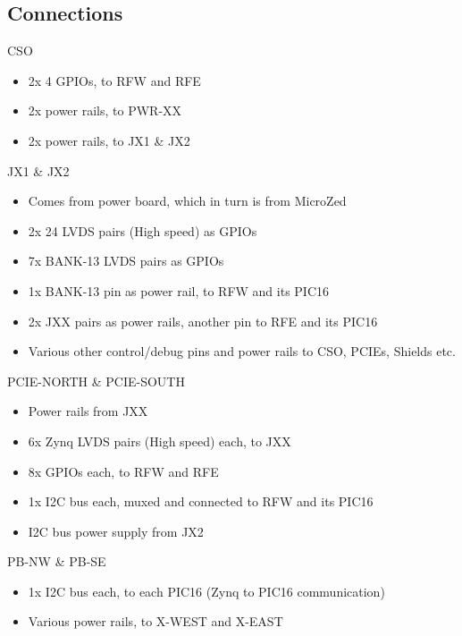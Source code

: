 \documentclass{beamer}
\begin{document}
\subsection{Connections}

\begin{frame}{CSO}
    \begin{itemize}
    \item 2x 4 GPIOs, to RFW and RFE 
    \item 2x power rails, to PWR-XX
    \item 2x power rails, to JX1 \& JX2
    \end{itemize}
\end{frame}

\begin{frame}{JX1 \& JX2}
    \begin{itemize}
    \item Comes from power board, which in turn is from MicroZed
    \item 2x 24 LVDS pairs (High speed) as GPIOs
    \item 7x BANK-13 LVDS pairs as GPIOs
    \item 1x BANK-13 pin as power rail, to RFW and its PIC16
    \item 2x JXX pairs as power rails, another pin to RFE and its PIC16
    \item Various other control/debug pins and power rails to CSO, PCIEs, Shields etc.
    \end{itemize}
\end{frame}

\begin{frame}{PCIE-NORTH \& PCIE-SOUTH}
    \begin{itemize}
    \item Power rails from JXX
    \item 6x Zynq LVDS pairs (High speed) each, to JXX
    \item 8x GPIOs each, to RFW and RFE 
    \item 1x I2C bus each, muxed and connected to RFW and its PIC16
    \item I2C bus power supply from JX2
    \end{itemize}
\end{frame}

\begin{frame}{PB-NW \& PB-SE}
    \begin{itemize}
    \item 1x I2C bus each, to each PIC16 (Zynq to PIC16 communication)
    \item Various power rails, to X-WEST and X-EAST
    \end{itemize}
\end{frame}
\end{document}
